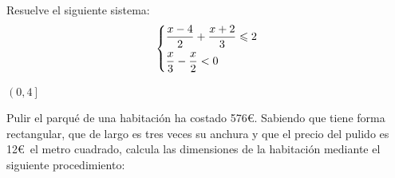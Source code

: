 \documentclass[addpoints,spanish, 12pt,a4paper]{exam}
\begin{document}
\begin{questions}

\question[2] Resuelve el siguiente sistema:
 $$\left\{ \begin{gathered}
  \frac{{x - 4}}{2} + \frac{{x + 2}}{3} \leqslant 2 \hfill \\
  \frac{x}{3} - \frac{x}{2} < 0 \hfill \\ 
\end{gathered}  \right.$$
	\begin{solution} $\left(0, 4\right]$ \end{solution}

\question %
Pulir el parqué de una habitación ha costado 576\euro. Sabiendo que tiene forma rectangular, que de largo es tres veces su anchura y que el precio del pulido es 12\euro \ el metro cuadrado, calcula las dimensiones de la habitación mediante el siguiente procedimiento:


\end{questions}
\end{document}

